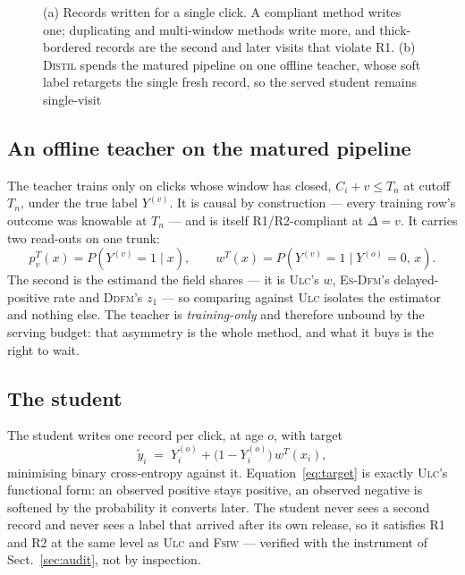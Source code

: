 \documentclass[runningheads]{llncs}
\newcommand{\Yo}{Y^{(o)}}
\newcommand{\Yv}{Y^{(v)}}
\begin{document}
\begin{figure}[t]
\centering

\caption{(a) Records written for a single click. A compliant method writes one; duplicating and
multi-window methods write more, and thick-bordered records are the second and later visits that
violate R1. (b) \textsc{Distil} spends the matured pipeline on one offline teacher, whose soft label
retargets the single fresh record, so the served student remains single-visit}
\label{fig:pipeline}
\end{figure}

\subsection{An offline teacher on the matured pipeline}

The teacher trains only on clicks whose window has closed, $C_i + v \le T_n$ at cutoff $T_n$, under
the true label $\Yv$. It is causal by construction --- every training row's outcome was knowable at
$T_n$ --- and is itself R1/R2-compliant at $\Delta = v$. It carries two read-outs on one trunk:
\begin{equation}
p^{T}_v(x) = P(\Yv = 1 \mid x),
\qquad
w^{T}(x) = P(\Yv = 1 \mid \Yo = 0,\, x).
\end{equation}
The second is the estimand the field shares --- it is \textsc{Ulc}'s $w$, \textsc{Es-Dfm}'s
delayed-positive rate and \textsc{Ddfm}'s $z_1$ --- so comparing against \textsc{Ulc} isolates the
estimator and nothing else. The teacher is \emph{training-only} and therefore unbound by the serving
budget: that asymmetry is the whole method, and what it buys is the right to wait.

\subsection{The student}

The student writes one record per click, at age $o$, with target
\begin{equation}
\tilde{y}_i \;=\; \Yo_i + \bigl(1 - \Yo_i\bigr)\, w^{T}(x_i),
\label{eq:target}
\end{equation}
minimising binary cross-entropy against it. Equation~\eqref{eq:target} is exactly \textsc{Ulc}'s
functional form: an observed positive stays positive, an observed negative is softened by the
probability it converts later. The student never sees a second record and never sees a label that
arrived after its own release, so it satisfies R1 and R2 at the same level as \textsc{Ulc} and
\textsc{Fsiw} --- verified with the instrument of Sect.~\ref{sec:audit}, not by inspection.
\end{document}
